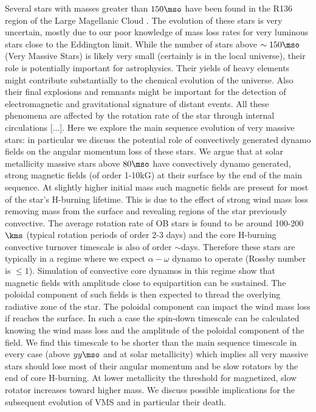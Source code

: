 Several stars with masses greater than $150\mso$ have been found in the R136 region of the Large Magellanic Cloud  \cite{sof_Parker_Goodwin_Kassim_2010}. The evolution of these stars is very uncertain, mostly due to our poor knowledge of mass loss rates for very luminous stars close to the Eddington limit. While the number of stars above $\sim 150\mso$ (Very Massive Stars) is likely very small (certainly is in the local universe), their role is potentially important for astrophysics. Their yields of heavy elements might contribute substantially to the chemical evolution of the universe. Also their final explosions and remnants might be important for the detection of electromagnetic and gravitational signature of distant events. All these phenomena are affected by the rotation rate of the star through internal circulations [...]. Here we explore the main sequence evolution of very massive stars: in particular we discuss the potential role of convectively generated dynamo fields on the angular momentum loss of these stars. We argue that at solar metallicity massive stars above $80\mso$ have convectively dynamo generated, strong magnetic fields (of order 1-10kG) at their surface by the end of the main sequence. At slightly higher initial mass such magnetic fields are present for most of the star's H-burning lifetime. This is due to the effect of strong wind mass loss removing mass from the surface and revealing regions of the star previously convective. The average rotation rate of OB stars is found to be around 100-200$\kms$ (typical rotation periods of order 2-3 days) and the core H-burning convective turnover timescale is also of order $\sim$days. Therefore these stars are typically in a regime where we expect $\alpha-\omega$ dynamo to operate (Rossby number is $\le 1$). Simulation of convective core dynamos in this regime show that magnetic fields with amplitude close to equipartition can be sustained. The poloidal component of such fields is then expected to thread the overlying radiative zone of the star. The poloidal component can impact the wind mass loss if reaches the surface.  In such a case the spin-down timescale can be calculated knowing the wind mass loss and the amplitude of the poloidal component of the field. We find this timescale to be shorter than the main sequence timescale in every case (above $yy\mso$ and at solar metallicity) which implies all very massive stars should lose most of their angular momentum and be slow rotators by the end of core H-burning. At lower metallicity the threshold for magnetized, slow rotator increases toward higher mass. We discuss possible implications for the subsequent evolution of VMS and in particular their death. 